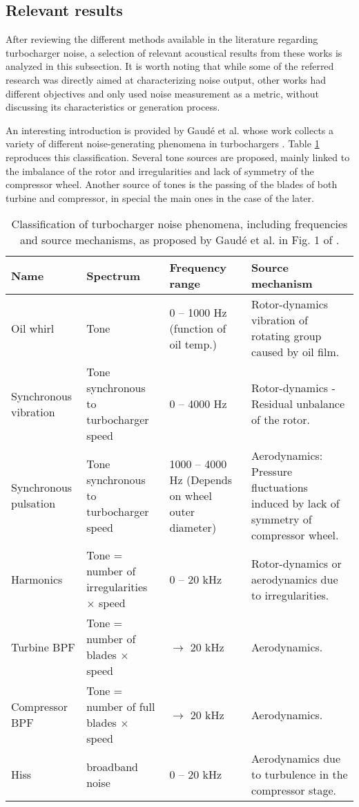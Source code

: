 \subsection{Relevant results}

After reviewing the different methods available in the literature regarding turbocharger noise, a selection of relevant acoustical results from these works is analyzed in this subsection. It is worth noting that while some of the referred research was directly aimed at characterizing noise output, other works had different objectives and only used noise measurement as a metric, without discussing its characteristics or generation process.

An interesting introduction is provided by Gaudé et al.  whose work collects a variety of different noise-generating phenomena in turbochargers \cite{gaude2008experimental}. Table \ref{tab:lit_gaude_sources} reproduces this classification. Several tone sources are proposed, mainly linked to the imbalance of the rotor and irregularities and lack of symmetry of the compressor wheel. Another source of tones is the passing of the blades of both turbine and compressor, in special the main ones in the case of the later.

\begin{table}[b!]
  \centering
  \caption{Classification of turbocharger noise phenomena, including frequencies and source mechanisms, as proposed by Gaudé et al. in Fig. 1 of \cite{gaude2008experimental}.}
  \footnotesize
  \begin{adjustwidth}{-0.6cm}{}
    \begin{tabular}{p{2cm}p{3cm}p{2.5cm}p{4cm}}
    \toprule
    \textbf{Name} & \textbf{Spectrum} & \textbf{Frequency range} & \textbf{Source mechanism} \\
    \midrule
    Oil whirl & Tone  & 0 -- 1000 Hz
(function of oil temp.) & Rotor-dynamics vibration of rotating group caused by oil film. \\
    Synchronous vibration & Tone synchronous to turbocharger speed & 0 -- 4000 Hz & Rotor-dynamics
- Residual unbalance of  the rotor. \\
    Synchronous pulsation & Tone synchronous to turbocharger speed & 1000 -- 4000 Hz
(Depends on wheel outer diameter) & Aerodynamics: Pressure fluctuations induced by lack of symmetry of compressor wheel. \\
    Harmonics & Tone = number of irregularities $\times$ speed & 0 -- 20 kHz & Rotor-dynamics or aerodynamics due to irregularities. \\
    Turbine BPF & Tone = number of blades $\times$ speed & $\rightarrow$ 20 kHz & Aerodynamics. \\
    Compressor BPF & Tone = number of full blades $\times$ speed & $\rightarrow$ 20 kHz & Aerodynamics. \\
    Hiss  & broadband noise & 0 -- 20 kHz & Aerodynamics due to turbulence in the compressor stage. \\
    \bottomrule
    \end{tabular}
    \end{adjustwidth}
  \label{tab:lit_gaude_sources}
\end{table}

